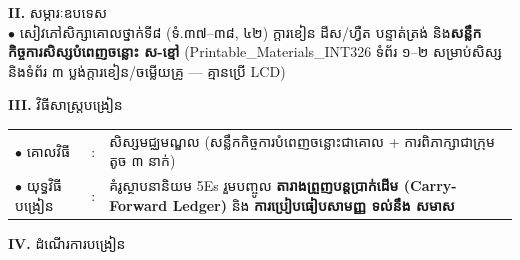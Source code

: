 \documentclass[a4paper,10pt]{article}
\newcommand{\en}[1]{{\TimesEn #1}}
\begin{document}
{%
\textbf{II.} {\muol សម្ភារៈឧបទេស}\\[1pt]
\hspace*{0.55cm}$\bullet$ \hspace{0.35cm} សៀវភៅសិក្សាគោលថ្នាក់ទី៨ (ទំ.៣៧–៣៨, ៤២) ក្ដារខៀន ដីស/ហ្វឺត បន្ទាត់ត្រង់ និង\textbf{សន្លឹកកិច្ចការសិស្សបំពេញចន្លោះ ស-ខ្មៅ} (\en{Printable\_Materials\_INT326} ទំព័រ ១–២ សម្រាប់សិស្ស និងទំព័រ ៣ ប្លង់ក្ដារខៀន/ចម្លើយគ្រូ — គ្មានប្រើ \en{LCD})

\vspace{2pt}

\textbf{III.} {\muol វិធីសាស្រ្តបង្រៀន}\\[1pt]
\hspace*{0.45cm}%
\begin{tabular}{@{}l l L{14.85cm}@{}}
  $\bullet$ \hspace{0.25cm} គោលវិធី & : & សិស្សមជ្ឈមណ្ឌល (សន្លឹកកិច្ចការបំពេញចន្លោះជាគោល + ការពិភាក្សាជាក្រុមតូច ៣ នាក់) \\
  $\bullet$ \hspace{0.25cm} យុទ្ធវិធីបង្រៀន & : & គំរូស្ថាបនានិយម \en{5Es} រួមបញ្ចូល \textbf{តារាងព្រួញបន្តប្រាក់ដើម (\en{Carry-Forward Ledger})} និង \textbf{ការប្រៀបធៀបសាមញ្ញ ទល់នឹង សមាស} \\
\end{tabular}
}

\vspace{2pt}

\textbf{IV.} {\muol ដំណើរការបង្រៀន}
\end{document}
